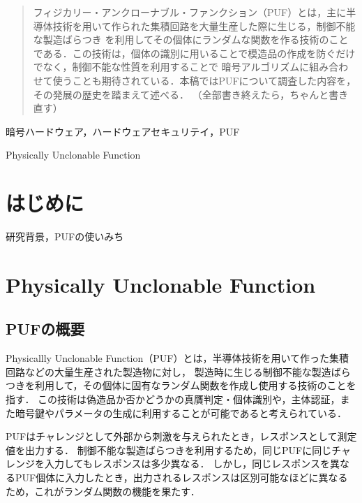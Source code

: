 \documentclass[technicalreport]{ieicej} %
\begin{document}
\begin{abstract}
  フィジカリー・アンクローナブル・ファンクション（PUF）とは，主に半導体技術を用いて作られた集積回路を大量生産した際に生じる，制御不能な製造ばらつき
  を利用してその個体にランダムな関数を作る技術のことである．この技術は，個体の識別に用いることで模造品の作成を防ぐだけでなく，制御不能な性質を利用することで
  暗号アルゴリズムに組み合わせて使うことも期待されている．本稿ではPUFについて調査した内容を，その発展の歴史を踏まえて述べる．
  （全部書き終えたら，ちゃんと書き直す）
\end{abstract}
\begin{keyword}
  暗号ハードウェア，ハードウェアセキュリテイ，PUF
\end{keyword}
\begin{eabstract}
\end{eabstract}
\begin{ekeyword}
  Physically Unclonable Function
\end{ekeyword}
\maketitle

\section{はじめに}
研究背景，PUFの使いみち

\section{Physically Unclonable Function}
\subsection{PUFの概要}
Physicallly Unclonable Function（PUF）とは，半導体技術を用いて作った集積回路などの大量生産された製造物に対し，
製造時に生じる制御不能な製造ばらつきを利用して，その個体に固有なランダム関数を作成し使用する技術のことを指す．
この技術は偽造品か否かどうかの真贋判定・個体識別や，主体認証，また暗号鍵やパラメータの生成に利用することが可能であると考えられている．

PUFはチャレンジとして外部から刺激を与えられたとき，レスポンスとして測定値を出力する．
制御不能な製造ばらつきを利用するため，同じPUFに同じチャレンジを入力してもレスポンスは多少異なる．
しかし，同じレスポンスを異なるPUF個体に入力したとき，出力されるレスポンスは区別可能なほどに異なるため，これがランダム関数の機能を果たす．
\end{document}
